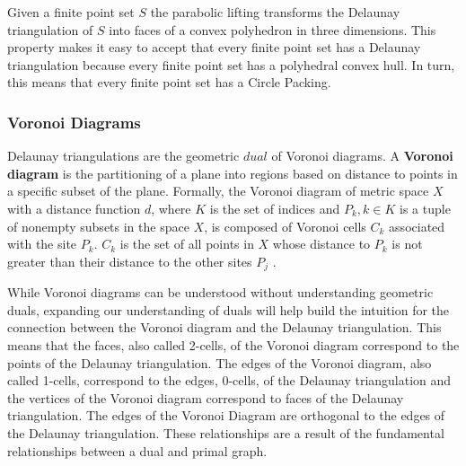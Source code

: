 \documentclass[11pt]{article}
\begin{document}
Given a finite point set $S$ the parabolic lifting transforms the Delaunay triangulation of $S$ into faces of a convex polyhedron in three dimensions. This property makes it easy to accept that every finite point set has a Delaunay triangulation because every finite point set has a polyhedral convex hull. In turn, this means that every finite point set has a Circle Packing.

\subsubsection{Voronoi Diagrams}
Delaunay triangulations are the geometric $dual$ of Voronoi diagrams. A \textbf{Voronoi diagram} is the partitioning of a plane into regions based on distance to points in a specific subset of the plane. Formally, the Voronoi diagram of metric space $X$ with a distance function $d$, where $K$ is the set of indices and $P_k, k \in K$ is a tuple of nonempty subsets in the space $X$, is composed of Voronoi cells $C_k$ associated with the site $P_k$. $C_k$ is the set of all points in $X$ whose distance to $P_k$ is not greater than their distance to the other sites $P_j$ \cite{voronoiDiagrams}. 

While Voronoi diagrams can be understood without understanding geometric duals, expanding our understanding of duals will help build the intuition for the connection between the Voronoi diagram and the Delaunay triangulation. This means that the faces, also called 2-cells, of the Voronoi diagram correspond to the points of the Delaunay triangulation. The edges of the Voronoi diagram, also called 1-cells, correspond to the edges, 0-cells, of the Delaunay triangulation and the vertices of the Voronoi diagram correspond to faces of the Delaunay triangulation. The edges of the Voronoi Diagram are orthogonal to the edges of the Delaunay triangulation. These relationships are a result of the fundamental relationships between a dual and primal graph.
\end{document}
